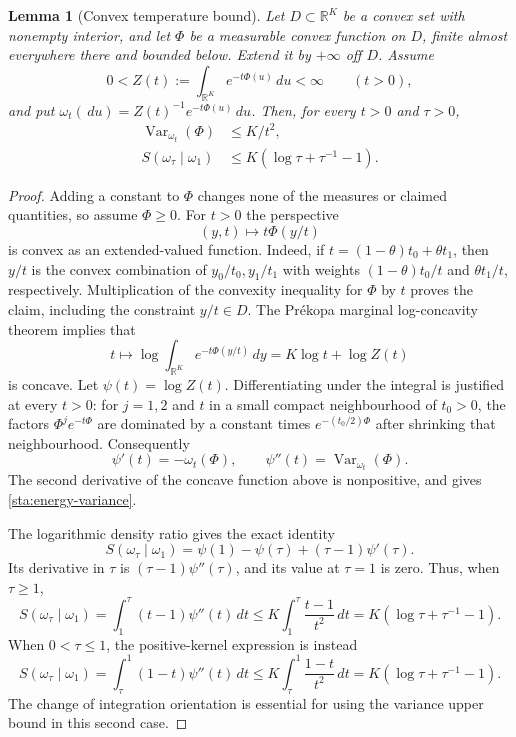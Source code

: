 \documentclass[11pt,reqno]{amsart}
\numberwithin{equation}{section}
\newtheorem{lemma}[theorem]{Lemma}
\theoremstyle{definition}
\newcommand{\R}{\mathbb R}
\newcommand{\1}{\mathbf 1}
\newcommand{\dd}{\,d}
\DeclareMathOperator{\Var}{Var}
\begin{document}
\begin{lemma}[Convex temperature bound]\label{sta:temperature}
Let $D\subset\R^K$ be a convex set with nonempty interior, and let
$\Phi$ be a measurable convex function on $D$, finite almost everywhere
there and bounded below. Extend it by $+\infty$ off $D$. Assume
\[
0<Z(t):=\int_{\R^K}e^{-t\Phi(u)}\dd u<\infty
\qquad(t>0),
\]
and put $\omega_t(\dd u)=Z(t)^{-1}e^{-t\Phi(u)}\dd u$.
Then, for every $t>0$ and $\tau>0$,
\begin{align}
\Var_{\omega_t}(\Phi)&\le K/t^2,
 \label{sta:energy-variance}\\
S(\omega_\tau\mid\omega_1)
 &\le K(\log\tau+\tau^{-1}-1).
 \label{sta:temperature-entropy}
\end{align}
\end{lemma}

\begin{proof}
Adding a constant to $\Phi$ changes none of the measures or claimed
quantities, so assume $\Phi\ge0$. For $t>0$ the perspective
\[
(y,t)\longmapsto t\Phi(y/t)
\]
is convex as an extended-valued function. Indeed, if
$t=(1-\theta)t_0+\theta t_1$, then
$y/t$ is the convex combination of $y_0/t_0,y_1/t_1$ with weights
$(1-\theta)t_0/t$ and $\theta t_1/t$, respectively. Multiplication of
the convexity inequality for $\Phi$ by $t$ proves the claim, including
the constraint $y/t\in D$.
The Pr\'ekopa marginal log-concavity theorem implies that
\[
t\longmapsto\log\int_{\R^K}e^{-t\Phi(y/t)}\dd y
 =K\log t+\log Z(t)
\]
is concave. Let $\psi(t)=\log Z(t)$. Differentiating under the integral
is justified at every $t>0$: for $j=1,2$ and $t$ in a small compact
neighbourhood of $t_0>0$, the factors $\Phi^j e^{-t\Phi}$ are dominated
by a constant times $e^{-(t_0/2)\Phi}$ after shrinking that
neighbourhood. Consequently
\[
\psi'(t)=-\omega_t(\Phi),\qquad
\psi''(t)=\Var_{\omega_t}(\Phi).
\]
The second derivative of the concave function above is nonpositive,
and gives \eqref{sta:energy-variance}.

The logarithmic density ratio gives the exact identity
\begin{equation}\label{sta:kl-identity}
S(\omega_\tau\mid\omega_1)
=\psi(1)-\psi(\tau)+(\tau-1)\psi'(\tau).
\end{equation}
Its derivative in $\tau$ is $(\tau-1)\psi''(\tau)$, and its value at
$\tau=1$ is zero. Thus, when $\tau\ge1$,
\[
S(\omega_\tau\mid\omega_1)
=\int_1^\tau(t-1)\psi''(t)\dd t
\le K\int_1^\tau\frac{t-1}{t^2}\dd t
=K(\log\tau+\tau^{-1}-1).
\]
When $0<\tau\le1$, the positive-kernel expression is instead
\[
S(\omega_\tau\mid\omega_1)
=\int_\tau^1(1-t)\psi''(t)\dd t
\le K\int_\tau^1\frac{1-t}{t^2}\dd t
=K(\log\tau+\tau^{-1}-1).
\]
The change of integration orientation is essential for using the
variance upper bound in this second case.
\end{proof}
\end{document}
